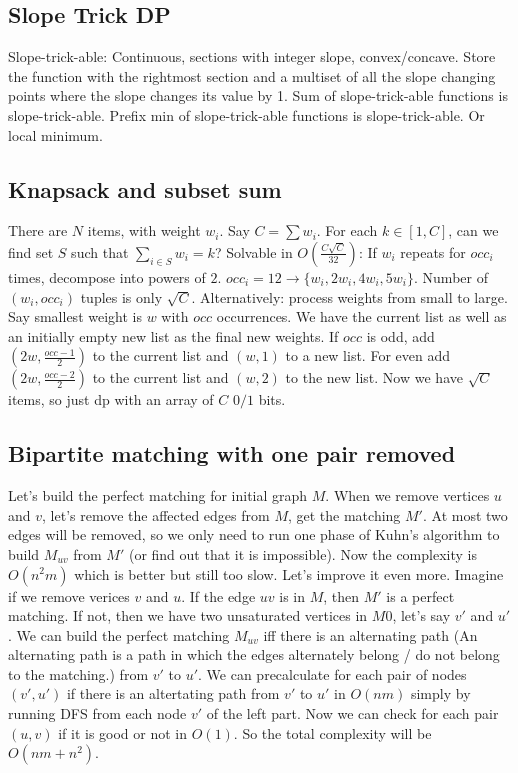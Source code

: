 \subsection{Slope Trick DP}
Slope-trick-able: Continuous, sections with integer slope, convex/concave.
Store the function with the rightmost section and a multiset of all the slope changing points where the slope changes its value by 1.
Sum of slope-trick-able functions is slope-trick-able.
Prefix min of slope-trick-able functions is slope-trick-able. Or local minimum.
\subsection{Knapsack and subset sum}
There are $N$ items, with weight $w_i$. Say $C=\sum w_i$. For each $k\in [1,C]$, can we find set $S$ such that $\sum_{i\in S}w_i=k$?
Solvable in $O(\frac{C\sqrt{C}}{32})$: If $w_i$ repeats for $occ_i$ times, decompose into powers of $2$.
$occ_i=12 \to \{w_i, 2w_i, 4w_i, 5w_i\}$. Number of $(w_i, occ_i)$ tuples is only $\sqrt{C}$.
Alternatively: process weights from small to large. Say smallest weight is $w$ with $occ$ occurrences. 
We have the current list as well as an initially empty new list as the final new weights.
If $occ$ is odd, add $(2w, \frac{occ-1}{2})$ to the current list and $(w, 1)$ to a new list. 
For even add $(2w, \frac{occ-2}{2})$ to the current list and $(w, 2)$ to the new list.
Now we have $\sqrt{C}$ items, so just dp with an array of $C$ $0/1$ bits.
\subsection{Bipartite matching with one pair removed}
Let's build the perfect matching for initial graph $M$. When we remove vertices $u$ and $v$, let's remove the
affected edges from $M$, get the matching $M'$. At most two edges will be removed, so we only need to
run one phase of Kuhn's algorithm to build $M_{uv}$ from $M'$ (or find out that it is impossible). Now the
complexity is $O(n^2 m)$ which is better but still too slow. Let's improve it even more.
Imagine if we remove verices $v$ and $u$. If the edge $uv$ is in $M$, then $M'$
is a perfect matching. If not, then we have two unsaturated vertices in $M0$, let's say $v'$ and $u'$. 
We can build the perfect matching $M_{uv}$ iff there is an alternating path 
(An alternating path is a path in which the edges alternately belong / do not belong to the matching.)
from $v'$ to $u'$. 
We can precalculate for each pair of nodes $(v', u')$ if there is an
altertating path from $v'$ to $u'$ in $O(nm)$ simply by running DFS from each node $v'$ of the left part.
Now we can check for each pair $(u, v)$ if it is good or not in $O(1)$. 
So the total complexity will be $O(nm + n^2)$.